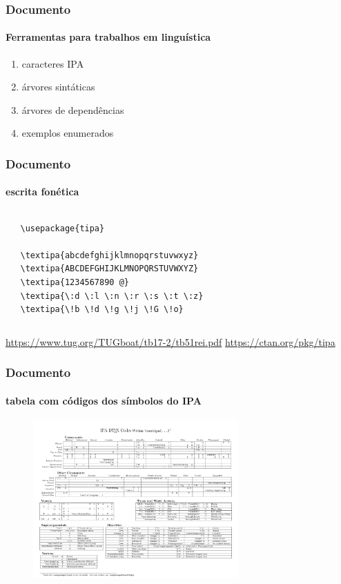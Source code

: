 \begin{frame}[fragile]
\frametitle{Documento}
\framesubtitle{Ferramentas para trabalhos em linguística}

\begin{enumerate}
    \item caracteres IPA
    \item árvores sintáticas
    \item árvores de dependências
    \item exemplos enumerados
\end{enumerate}

\end{frame}

\begin{frame}[fragile]
\frametitle{Documento}
\framesubtitle{escrita fonética}
  \scriptsize
  \begin{columns}[c]
  \begin{verbatim}
   \usepackage{tipa}
   
   \textipa{abcdefghijklmnopqrstuvwxyz}
   \textipa{ABCDEFGHIJKLMNOPQRSTUVWXYZ}
   \textipa{1234567890 @}
   \textipa{\:d \:l \:n \:r \:s \:t \:z}
   \textipa{\!b \!d \!g \!j \!G \!o}
  \end{verbatim}
  \begin{fmpage}{\textwidth}
  \end{fmpage}
  \end{columns}
  
  \url{https://www.tug.org/TUGboat/tb17-2/tb51rei.pdf}
  \url{https://ctan.org/pkg/tipa}
\end{frame}


\begin{frame}[fragile]
\frametitle{Documento}
\framesubtitle{tabela com códigos dos símbolos do IPA}
\vspace{-4ex}
\begin{figure}[h!]
  \centering
  \label{fig:tipachart}
  \includegraphics[width=0.7\textwidth]
                     {figures/tipachart_mod.pdf}
\end{figure}
\end{frame}



